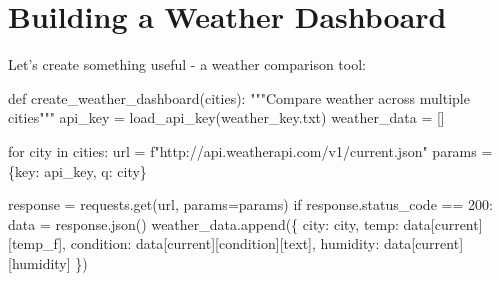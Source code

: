 \documentclass[
  letterpaper,
  DIV=11,
  numbers=noendperiod,
  oneside]{scrreprt}
\newenvironment{Shaded}{}{}
\newcommand{\CommentTok}[1]{\textcolor[rgb]{0.42,0.45,0.49}{#1}}
\newcommand{\ControlFlowTok}[1]{\textcolor[rgb]{0.84,0.23,0.29}{#1}}
\newcommand{\DecValTok}[1]{\textcolor[rgb]{0.00,0.36,0.77}{#1}}
\newcommand{\KeywordTok}[1]{\textcolor[rgb]{0.84,0.23,0.29}{#1}}
\newcommand{\NormalTok}[1]{\textcolor[rgb]{0.14,0.16,0.18}{#1}}
\newcommand{\OperatorTok}[1]{\textcolor[rgb]{0.14,0.16,0.18}{#1}}
\newcommand{\SpecialStringTok}[1]{\textcolor[rgb]{0.01,0.18,0.38}{#1}}
\newcommand{\StringTok}[1]{\textcolor[rgb]{0.01,0.18,0.38}{#1}}
\begin{document}
\section{Building a Weather
Dashboard}\label{building-a-weather-dashboard}

Let's create something useful - a weather comparison tool:

\begin{Shaded}
\begin{Highlighting}[]
\KeywordTok{def}\NormalTok{ create\_weather\_dashboard(cities):}
    \CommentTok{"""Compare weather across multiple cities"""}
\NormalTok{    api\_key }\OperatorTok{=}\NormalTok{ load\_api\_key(}\StringTok{\textquotesingle{}weather\_key.txt\textquotesingle{}}\NormalTok{)}
\NormalTok{    weather\_data }\OperatorTok{=}\NormalTok{ []}
    
    \ControlFlowTok{for}\NormalTok{ city }\KeywordTok{in}\NormalTok{ cities:}
\NormalTok{        url }\OperatorTok{=} \SpecialStringTok{f"http://api.weatherapi.com/v1/current.json"}
\NormalTok{        params }\OperatorTok{=}\NormalTok{ \{}\StringTok{\textquotesingle{}key\textquotesingle{}}\NormalTok{: api\_key, }\StringTok{\textquotesingle{}q\textquotesingle{}}\NormalTok{: city\}}
        
\NormalTok{        response }\OperatorTok{=}\NormalTok{ requests.get(url, params}\OperatorTok{=}\NormalTok{params)}
        \ControlFlowTok{if}\NormalTok{ response.status\_code }\OperatorTok{==} \DecValTok{200}\NormalTok{:}
\NormalTok{            data }\OperatorTok{=}\NormalTok{ response.json()}
\NormalTok{            weather\_data.append(\{}
                \StringTok{\textquotesingle{}city\textquotesingle{}}\NormalTok{: city,}
                \StringTok{\textquotesingle{}temp\textquotesingle{}}\NormalTok{: data[}\StringTok{\textquotesingle{}current\textquotesingle{}}\NormalTok{][}\StringTok{\textquotesingle{}temp\_f\textquotesingle{}}\NormalTok{],}
                \StringTok{\textquotesingle{}condition\textquotesingle{}}\NormalTok{: data[}\StringTok{\textquotesingle{}current\textquotesingle{}}\NormalTok{][}\StringTok{\textquotesingle{}condition\textquotesingle{}}\NormalTok{][}\StringTok{\textquotesingle{}text\textquotesingle{}}\NormalTok{],}
                \StringTok{\textquotesingle{}humidity\textquotesingle{}}\NormalTok{: data[}\StringTok{\textquotesingle{}current\textquotesingle{}}\NormalTok{][}\StringTok{\textquotesingle{}humidity\textquotesingle{}}\NormalTok{]}
\NormalTok{            \})}
    

\end{Highlighting}
\end{Shaded}
\end{document}
